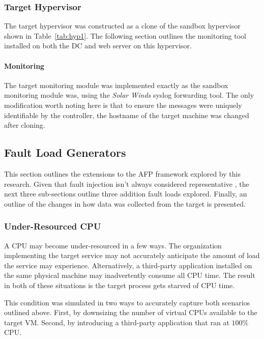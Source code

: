 \subsubsection{Target Hypervisor} \label{sec:target}
The target hypervisor was constructed as a clone of the sandbox hypervisor
shown in Table~\ref{tab:hyp1}.  The following section outlines the monitoring
tool installed on both the \ac{DC} and web server on this hypervisor.

\paragraph{Monitoring} \label{sec:targetMonitoringTool}
The target monitoring module was implemented exactly as the sandbox monitoring
module was, using the \emph{Solar Winds} syslog forwarding tool.  The only
modification worth noting here is that to ensure the messages were uniquely
identifiable by the controller, the hostname of the target machine was changed
after cloning.

\setcounter{secnumdepth}{3}

\subsection{Fault Load Generators} \label{sec:extensions}
This section outlines the extensions to the \ac{AFP} framework explored by this
research.  Given that fault injection isn't always considered representative
\citep{kikuchi2014}, the next three sub-sections outline three addition fault
loads explored.  Finally, an outline of the changes in how data was collected
from the target is presented.

\subsubsection{Under-Resourced \ac{CPU}} \label{sec:extUnderResourcedCPU}
A \ac{CPU} may become under-resourced in a few ways.  The organization
implementing the target service may not accurately anticipate the amount of
load the service may experience.  Alternatively, a third-party application
installed on the same physical machine may inadvertently consume all \ac{CPU}
time.  The result in both of these situations is the target process gets
starved of \ac{CPU} time.

This condition was simulated in two ways to accurately capture both scenarios
outlined above.  First, by downsizing the number of virtual \ac{CPU}s available
to the target \ac{VM}.  Second, by introducing a third-party application that
ran at $100\%$ \ac{CPU}.

